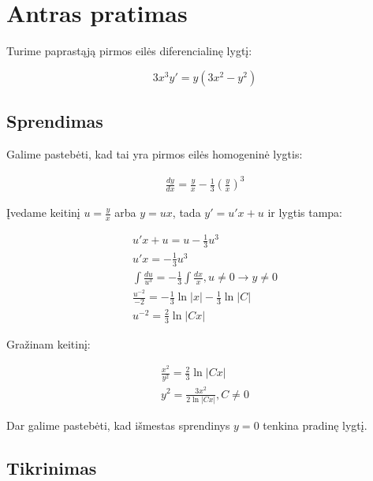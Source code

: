 \documentclass[11pt]{article}
\begin{document}
\newpage
\section{Antras pratimas}

Turime paprastąją pirmos eilės diferencialinę lygtį:

\begin{equation}
    3x^3y'=y(3x^2-y^2)
\end{equation}

\subsection{Sprendimas}

Galime pastebėti, kad tai yra pirmos eilės homogeninė lygtis:

\begin{equation}
\begin{split}
\frac{dy}{dx}=\frac{y}{x}-\frac{1}{3}\left(\frac{y}{x}\right)^3
\end{split}
\end{equation}

Įvedame keitinį $u=\frac{y}{x}$ arba $y=ux$, tada $y'=u'x+u$ ir lygtis tampa:

\begin{equation}
\begin{split}
u'x+u=u-\frac{1}{3}u^3\\
u'x=-\frac{1}{3}u^3\\
\int\frac{du}{u^3}=-\frac{1}{3}\int\frac{dx}{x}, u\ne 0\rightarrow y\ne 0\\
\frac{u^{-2}}{-2}=-\frac{1}{3}\ln|x|-\frac{1}{3}\ln|C|\\
u^{-2}=\frac{2}{3}\ln|Cx|
\end{split}
\end{equation}

Gražinam keitinį:

\begin{equation}
\begin{split}
\frac{x^2}{y^2}=\frac{2}{3}\ln|Cx|\\
y^2=\frac{3x^2}{2\ln|Cx|}, C \neq 0
\end{split}
\end{equation}

Dar galime pastebėti, kad išmestas sprendinys $y=0$ tenkina pradinę lygtį.

\newpage
\subsection{Tikrinimas}
\end{document}
